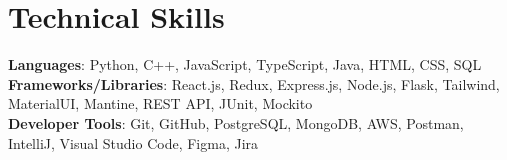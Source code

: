 \section{Technical Skills}
\begin{itemize}[leftmargin=0.15in, label={}]
    \small{\item{     
        \textbf{Languages}{: Python, C++, JavaScript, TypeScript, Java, HTML, CSS, SQL} \\
     
        \textbf{Frameworks/Libraries}{: React.js, Redux, Express.js, Node.js, Flask, Tailwind, MaterialUI, Mantine, REST API, JUnit, Mockito} \\

        \textbf{Developer Tools}{: Git, GitHub, PostgreSQL, MongoDB, AWS, Postman, IntelliJ, Visual Studio Code, Figma, Jira} \\
    }}
\end{itemize}
